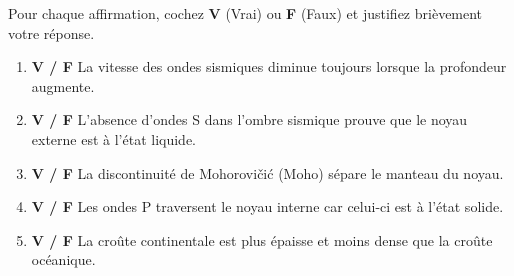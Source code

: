 \documentclass[11pt]{article}
\begin{document}
\begin{exercice}
Pour chaque affirmation, cochez \textbf{V} (Vrai) ou \textbf{F} (Faux) et justifiez brièvement votre réponse.
\begin{enumerate}
    \item \textbf{V / F} La vitesse des ondes sismiques diminue toujours lorsque la profondeur augmente.
    \item \textbf{V / F} L'absence d'ondes S dans l'ombre sismique prouve que le noyau externe est à l'état liquide.
    \item \textbf{V / F} La discontinuité de Mohorovičić (Moho) sépare le manteau du noyau.
    \item \textbf{V / F} Les ondes P traversent le noyau interne car celui-ci est à l'état solide.
    \item \textbf{V / F} La croûte continentale est plus épaisse et moins dense que la croûte océanique.
\end{enumerate}
\end{exercice}
\end{document}
